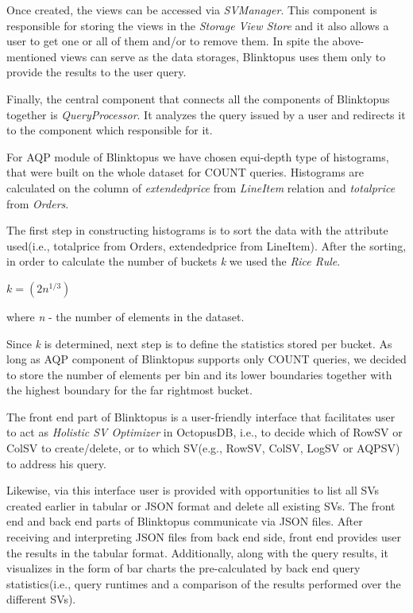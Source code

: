 \documentclass[10pt, conference, compsocconf]{IEEEtran}
\begin{document}
Once created, the views can be accessed via \textit{SVManager}. This component is responsible for storing the views in the \textit{Storage View Store} and it also allows a user to get one or all of them and/or to remove them.
In spite the above-mentioned views can serve as the data storages, Blinktopus uses them only to provide the results to the user query. 

Finally, the central component that connects all the components of Blinktopus together is \textit{QueryProcessor}. It analyzes the query issued by a user and redirects it to the component which responsible for it.

For AQP module of Blinktopus we have chosen equi-depth type of histograms, that were built on the whole dataset for COUNT queries. Histograms are calculated on the column of \textit{extendedprice} from \textit{LineItem} relation and \textit{totalprice} from \textit{Orders}.

The first step in constructing histograms is to sort the data with the attribute used(i.e., totalprice from Orders, extendedprice from LineItem). After the sorting, in order to calculate the number of buckets \textit{k} we used the \textit{Rice Rule}.

$\textit{k}=(2\textit{n}^{1/3})$

where \textit{n} - the number of elements in the dataset.
 
Since \textit{k} is determined, next step is to define the statistics stored per bucket. As long as AQP component of Blinktopus supports only COUNT queries, we decided to store the number of elements per bin and its lower boundaries together with the highest boundary for the far rightmost bucket.

The front end part of Blinktopus is a user-friendly interface that facilitates user to act as \textit{Holistic SV Optimizer} in OctopusDB, i.e., to decide which of RowSV or ColSV to create/delete, or to which SV(e.g., RowSV, ColSV, LogSV or AQPSV) to address his query. 

Likewise, via this interface user is provided with opportunities to list all SVs created earlier in tabular or JSON format and delete all existing SVs.
The front end and back end parts of Blinktopus communicate via JSON files. After receiving and interpreting JSON files from back end side, front end provides user the results in the tabular format. Additionally, along with the query results, it visualizes in the form of bar charts the pre-calculated by back end query statistics(i.e., query runtimes and a comparison of the results performed over the different SVs).
\end{document}
